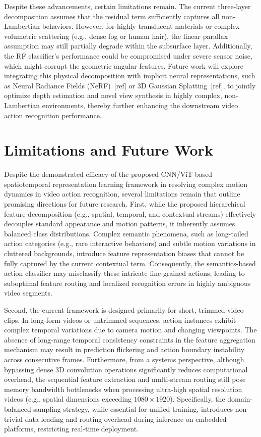 \documentclass[lettersize,journal]{IEEEtran}
\begin{document}
Despite these advancements, certain limitations remain. The current three-layer decomposition assumes that the residual term sufficiently captures all non-Lambertian behaviors. However, for highly translucent materials or complex volumetric scattering (e.g., dense fog or human hair), the linear parallax assumption may still partially degrade within the subsurface layer. Additionally, the RF classifier's performance could be compromised under severe sensor noise, which might corrupt the geometric angular features. Future work will explore integrating this physical decomposition with implicit neural representations, such as Neural Radiance Fields (NeRF)~[ref] or 3D Gaussian Splatting~[ref], to jointly optimize depth estimation and novel view synthesis in highly complex, non-Lambertian environments, thereby further enhancing the downstream video action recognition performance.

\section{Limitations and Future Work}

Despite the demonstrated efficacy of the proposed CNN/ViT-based spatiotemporal representation learning framework in resolving complex motion dynamics in video action recognition, several limitations remain that outline promising directions for future research. First, while the proposed hierarchical feature decomposition (e.g., spatial, temporal, and contextual streams) effectively decouples standard appearance and motion patterns, it inherently assumes balanced class distributions. Complex semantic phenomena, such as long-tailed action categories (e.g., rare interactive behaviors) and subtle motion variations in cluttered backgrounds, introduce feature representation biases that cannot be fully captured by the current contextual term. Consequently, the semantics-based action classifier may misclassify these intricate fine-grained actions, leading to suboptimal feature routing and localized recognition errors in highly ambiguous video segments.

Second, the current framework is designed primarily for short, trimmed video clips. In long-form videos or untrimmed sequences, action instances exhibit complex temporal variations due to camera motion and changing viewpoints. The absence of long-range temporal consistency constraints in the feature aggregation mechanism may result in prediction flickering and action boundary instability across consecutive frames. Furthermore, from a systems perspective, although bypassing dense 3D convolution operations significantly reduces computational overhead, the sequential feature extraction and multi-stream routing still pose memory bandwidth bottlenecks when processing ultra-high spatial resolution videos (e.g., spatial dimensions exceeding $1080 \times 1920$). Specifically, the domain-balanced sampling strategy, while essential for unified training, introduces non-trivial data loading and routing overhead during inference on embedded platforms, restricting real-time deployment.
\end{document}
